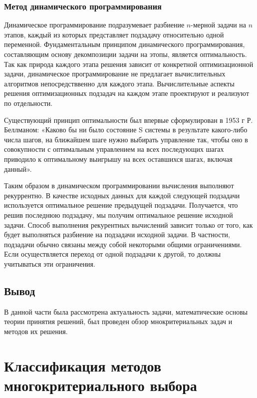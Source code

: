 \subsection{Метод динамического программирования}

Динамическое программирование подразумевает разбиение $n$-мерной задачи на $n$ этапов, каждый из которых представляет подзадачу относительно одной переменной. Фундаментальным принципом динамического программирования, составляющим основу декомпозиции задачи на этопы, является оптимальность. Так как природа каждого этапа решения зависит от конкретной оптимизационной задачи, динамическое программирование не предлагает вычислительных алгоритмов непосредстввенно для каждого этапа. Вычислительные аспекты решения оптимизационных подзадач на каждом этапе проектируют и реализуют по отдельности.

Существующий принцип оптимальности был впервые сформулирован в 1953 г Р. Беллманом: «Каково бы ни было состояние S системы в результате какого-либо числа шагов, на ближайшем шаге нужно выбирать управление так, чтобы оно в совокупности с оптимальным управлением на всех последующих шагах приводило к оптимальному выигрышу на всех оставшихся шагах, включая данный».

Таким образом в динамическом программировании вычисления выполняют рекуррентно. В качестве исходных данных для каждой следующей подзадачи используется оптимальное решение предыдущей подзадачи. Получается, что решив последнюю подзадачу, мы получим оптимальное решение исходной задачи. Способ выполнения рекурентных вычислений зависит только от того, как будет выполняться разбиение на подзадачи исходной задачи. В частности, подзадачи обычно связаны между собой некоторыми общими ограничениями. Если осуществляется переход от одной подзадачи к другой, то должны учитываться эти ограничения. \cite{bib2}

\section{Вывод}

В данной части была рассмотрена актуальность задачи, математические основы теории принятия решений, был проведен обзор мнокритериальных задач и методов их решения.

\newpage 

\chapter{Классификация методов многокритериального выбора}


